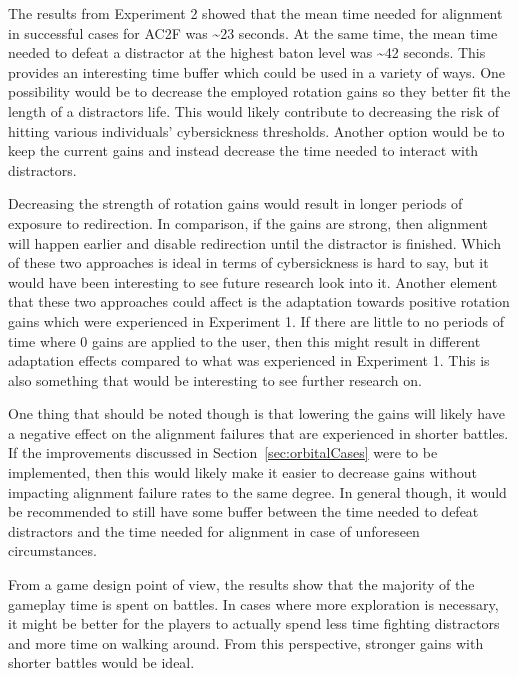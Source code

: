 The results from Experiment 2 showed that the mean time needed for alignment in successful cases for AC2F was \textasciitilde23 seconds. At the same time, the mean time needed to defeat a distractor at the highest baton level was \textasciitilde42 seconds. This provides an interesting time buffer which could be used in a variety of ways. One possibility would be to decrease the employed rotation gains so they better fit the length of a distractors life. This would likely contribute to decreasing the risk of hitting various individuals' cybersickness thresholds. Another option would be to keep the current gains and instead decrease the time needed to interact with distractors. 

Decreasing the strength of rotation gains would result in longer periods of exposure to redirection. In comparison, if the gains are strong, then alignment will happen earlier and disable redirection until the distractor is finished. Which of these two approaches is ideal in terms of cybersickness is hard to say, but it would have been interesting to see future research look into it. Another element that these two approaches could affect is the adaptation towards positive rotation gains which were experienced in Experiment 1. If there are little to no periods of time where 0 gains are applied to the user, then this might result in different adaptation effects compared to what was experienced in Experiment 1. This is also something that would be interesting to see further research on.

One thing that should be noted though is that lowering the gains will likely have a negative effect on the alignment failures that are experienced in shorter battles. If the improvements discussed in Section~\ref{sec:orbitalCases} were to be implemented, then this would likely make it easier to decrease gains without impacting alignment failure rates to the same degree. In general though, it would be recommended to still have some buffer between the time needed to defeat distractors and the time needed for alignment in case of unforeseen circumstances.
   
From a game design point of view, the results show that the majority of the gameplay time is spent on battles. In cases where more exploration is necessary, it might be better for the players to actually spend less time fighting distractors and more time on walking around. From this perspective, stronger gains with shorter battles would be ideal. 
   
